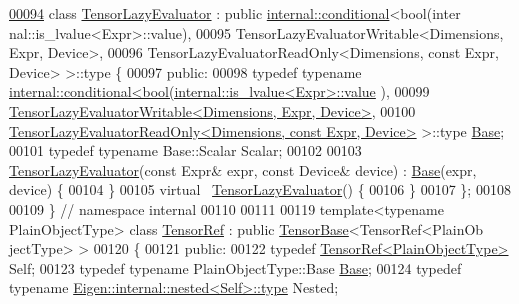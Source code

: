 \begin{DoxyCode}
\hyperlink{class_eigen_1_1internal_1_1_tensor_lazy_evaluator}{00094} \textcolor{keyword}{class }\hyperlink{class_eigen_1_1internal_1_1_tensor_lazy_evaluator}{TensorLazyEvaluator} : \textcolor{keyword}{public} \hyperlink{struct_eigen_1_1internal_1_1conditional}{internal::conditional}<bool(inter
      nal::is\_lvalue<Expr>::value),
00095                             TensorLazyEvaluatorWritable<Dimensions, Expr, Device>,
00096                             TensorLazyEvaluatorReadOnly<Dimensions, const Expr, Device> >::type \{
00097  \textcolor{keyword}{public}:
00098   \textcolor{keyword}{typedef} \textcolor{keyword}{typename} \hyperlink{struct_eigen_1_1internal_1_1conditional}{internal::conditional<bool(internal::is\_lvalue<Expr>::value}
      ),
00099                                          
      \hyperlink{class_eigen_1_1internal_1_1_tensor_lazy_evaluator_writable}{TensorLazyEvaluatorWritable<Dimensions, Expr, Device>},
00100                                          
      \hyperlink{class_eigen_1_1internal_1_1_tensor_lazy_evaluator_read_only}{TensorLazyEvaluatorReadOnly<Dimensions, const Expr, Device>}
       >::type \hyperlink{class_eigen_1_1internal_1_1_tensor_lazy_evaluator_read_only}{Base};
00101   \textcolor{keyword}{typedef} \textcolor{keyword}{typename} Base::Scalar Scalar;
00102 
00103   \hyperlink{class_eigen_1_1internal_1_1_tensor_lazy_evaluator}{TensorLazyEvaluator}(\textcolor{keyword}{const} Expr& expr, \textcolor{keyword}{const} Device& device) : 
      \hyperlink{class_eigen_1_1internal_1_1_tensor_lazy_evaluator_read_only}{Base}(expr, device) \{
00104   \}
00105   \textcolor{keyword}{virtual} ~\hyperlink{class_eigen_1_1internal_1_1_tensor_lazy_evaluator}{TensorLazyEvaluator}() \{
00106   \}
00107 \};
00108 
00109 \}  \textcolor{comment}{// namespace internal}
00110 
00111 
00119 \textcolor{keyword}{template}<\textcolor{keyword}{typename} PlainObjectType> \textcolor{keyword}{class }\hyperlink{class_eigen_1_1_tensor_ref}{TensorRef} : \textcolor{keyword}{public} \hyperlink{class_eigen_1_1_tensor_base}{TensorBase}<TensorRef<PlainOb
      jectType> >
00120 \{
00121   \textcolor{keyword}{public}:
00122     \textcolor{keyword}{typedef} \hyperlink{class_eigen_1_1_tensor_ref}{TensorRef<PlainObjectType>} Self;
00123     \textcolor{keyword}{typedef} \textcolor{keyword}{typename} PlainObjectType::Base \hyperlink{class_eigen_1_1internal_1_1_tensor_lazy_evaluator_read_only}{Base};
00124     \textcolor{keyword}{typedef} \textcolor{keyword}{typename} \hyperlink{class_eigen_1_1internal_1_1_tensor_lazy_evaluator_writable}{Eigen::internal::nested<Self>::type} Nested;

\end{DoxyCode}
